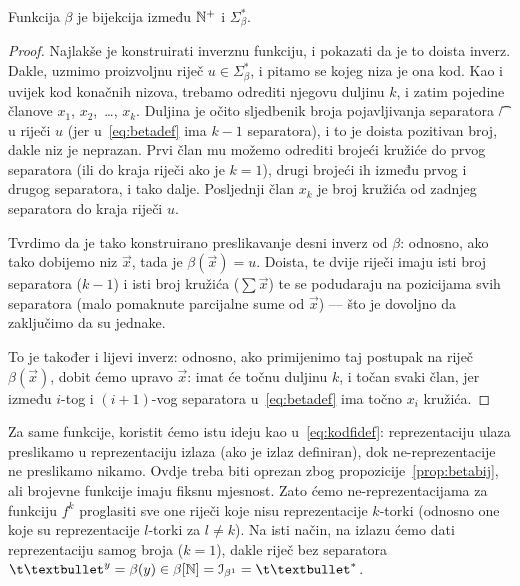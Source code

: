 \begin{propozicija}[{name=[bijektivnost binarne reprezentacije]}]\label{prop:betabij}
Funkcija $\beta$ je bijekcija između ${\mathbb N}^+$ i $\Sigma_\beta^*$.
\end{propozicija}
\begin{proof}
Najlakše je konstruirati inverznu funkciju, i pokazati da je to doista inverz. Dakle, uzmimo proizvoljnu riječ $u\in\Sigma_\beta^*$, i pitamo se kojeg niza je ona kod. Kao i uvijek kod konačnih nizova, trebamo odrediti njegovu duljinu $k$, i zatim pojedine članove $x_1$, $x_2$,~\ldots, $x_k$. Duljina je očito sljedbenik broja pojavljivanja separatora \t/ u riječi $u$ (jer u~\eqref{eq:betadef} ima $k-1$ separatora), i to je doista pozitivan broj, dakle niz je neprazan. Prvi član mu možemo odrediti brojeći kružiće do prvog separatora (ili do kraja riječi ako je $k=1$), drugi brojeći ih između prvog i drugog separatora, i tako dalje. Posljednji član $x_k$ je broj kružića od zadnjeg separatora do kraja riječi $u$.

Tvrdimo da je tako konstruirano preslikavanje desni inverz od $\beta$: odnosno, ako tako dobijemo niz $\vec x$, tada je $\beta(\vec x)=u$. Doista, te dvije riječi imaju isti broj separatora ($k-1$) i isti broj kružića ($\sum\vec x$) te se podudaraju na pozicijama svih separatora (malo pomaknute parcijalne sume od $\vec x$) --- što je dovoljno da zaključimo da su jednake.

To je također i lijevi inverz: odnosno, ako primijenimo taj postupak na riječ $\beta(\vec x)$, dobit ćemo upravo $\vec x$: imat će točnu duljinu $k$, i točan svaki član, jer između $i$-tog i $(i+1)$-vog separatora u~\eqref{eq:betadef} ima točno $x_i$ kružića.
\end{proof}

Za same funkcije, koristit ćemo istu ideju kao u~\eqref{eq:kodfidef}: reprezentaciju ulaza preslikamo u reprezentaciju izlaza (ako je izlaz definiran), dok ne-reprezentacije ne preslikamo nikamo. Ovdje treba biti oprezan zbog propozicije~\ref{prop:betabij}, ali brojevne funkcije imaju fiksnu mjesnost. Zato ćemo ne-reprezentacijama za funkciju $f^k$ proglasiti sve one riječi koje nisu reprezentacije $k$-torki (odnosno one koje su reprezentacije $l$-torki za $l\ne k$). Na isti način, na izlazu ćemo dati reprezentaciju samog broja ($k=1$), dakle riječ bez separatora $\t\textbullet^y=\beta(y)\in\beta[\N]=\im{\beta^1}=\t\textbullet^*$.

